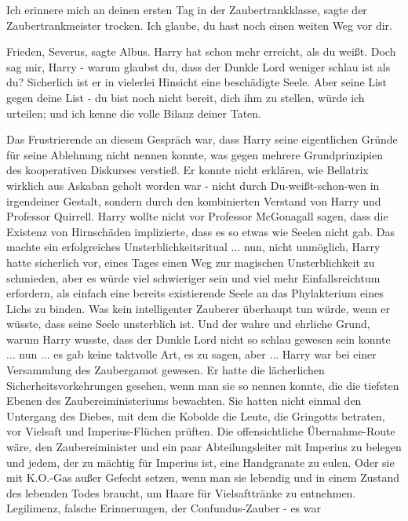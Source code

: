 \glqq{}Ich erinnere mich an deinen ersten Tag in der Zaubertrankklasse\grqq{},
sagte der Zaubertrankmeister trocken. \glqq{}Ich glaube, du hast noch einen
weiten Weg vor dir.\grqq{}

\glqq{}Frieden, Severus\grqq{}, sagte Albus. \glqq{}Harry hat schon mehr erreicht,
als du weißt. Doch sag mir, Harry - warum glaubst du, dass der Dunkle Lord
weniger schlau ist als du? Sicherlich ist er in vielerlei Hinsicht eine
beschädigte Seele. Aber seine List gegen deine List - du bist noch nicht bereit,
dich ihm zu stellen, würde ich urteilen; und ich kenne die volle Bilanz deiner
Taten.\grqq{}

Das Frustrierende an diesem Gespräch war, dass Harry seine eigentlichen Gründe
für seine Ablehnung nicht nennen konnte, was gegen mehrere Grundprinzipien des
kooperativen Diskurses verstieß. Er konnte nicht erklären, wie Bellatrix
wirklich aus Askaban geholt worden war - nicht durch Du-weißt-schon-wen in
irgendeiner Gestalt, sondern durch den kombinierten Verstand von Harry und
Professor Quirrell. Harry wollte nicht vor Professor McGonagall sagen, dass die
Existenz von Hirnschäden implizierte, dass es so etwas wie Seelen nicht gab. Das
machte ein erfolgreiches Unsterblichkeitsritual ... nun, nicht unmöglich, Harry
hatte sicherlich vor, eines Tages einen Weg zur magischen Unsterblichkeit zu
schmieden, aber es würde viel schwieriger sein und viel mehr Einfallsreichtum
erfordern, als einfach eine bereits existierende Seele an das Phylakterium eines
Lichs zu binden. Was kein intelligenter Zauberer überhaupt tun würde, wenn er
wüsste, dass seine Seele unsterblich ist. Und der wahre und ehrliche Grund,
warum Harry wusste, dass der Dunkle Lord nicht so schlau gewesen sein konnte ...
nun ... es gab keine taktvolle Art, es zu sagen, aber ... Harry war bei einer
Versammlung des Zaubergamot gewesen. Er hatte die lächerlichen \glqq{}
Sicherheitsvorkehrungen\grqq{} gesehen, wenn man sie so nennen konnte, die die
tiefsten Ebenen des Zaubereiministeriums bewachten. Sie hatten nicht einmal den
\glqq{}Untergang des Diebes\grqq{}, mit dem die Kobolde die Leute, die Gringotts
betraten, vor Vielsaft und Imperius-Flüchen prüften. Die offensichtliche
Übernahme-Route wäre, den Zaubereiminister und ein paar Abteilungsleiter mit
Imperius zu belegen und jedem, der zu mächtig für Imperius ist, eine Handgranate
zu eulen. Oder sie mit K.O.-Gas außer Gefecht setzen, wenn man sie lebendig und
in einem Zustand des lebenden Todes braucht, um Haare für Vielsafttränke zu
entnehmen. Legilimenz, falsche Erinnerungen, der Confundus-Zauber - es war
